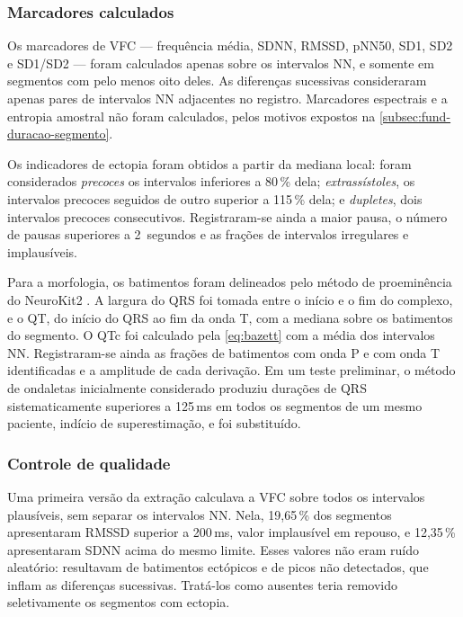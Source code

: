 \subsubsection{Marcadores calculados}

Os marcadores de \gls{VFC} --- frequência média, SDNN, RMSSD, pNN50, SD1,
SD2 e SD1/SD2 --- foram calculados apenas sobre os intervalos NN, e somente
em segmentos com pelo menos oito deles. As diferenças sucessivas
consideraram apenas pares de intervalos NN adjacentes no registro.
Marcadores espectrais e a entropia amostral não foram calculados, pelos
motivos expostos na \autoref{subsec:fund-duracao-segmento}.

Os indicadores de ectopia foram obtidos a partir da mediana local: foram
considerados \textit{precoces} os intervalos inferiores a 80\,\% dela;
\textit{extrassístoles}, os intervalos precoces seguidos de outro superior a
115\,\% dela; e \textit{dupletes}, dois intervalos precoces consecutivos.
Registraram-se ainda a maior pausa, o número de pausas superiores a
2~segundos e as frações de intervalos irregulares e implausíveis.

Para a morfologia, os batimentos foram delineados pelo método de
proeminência do NeuroKit2 \cite{emrich2024}. A largura do QRS foi tomada
entre o início e o fim do complexo, e o QT, do início do QRS ao fim da onda
T, com a mediana sobre os batimentos do segmento. O QTc foi calculado pela
\autoref{eq:bazett} com a média dos intervalos NN. Registraram-se ainda as
frações de batimentos com onda P e com onda T identificadas e a amplitude
de cada derivação. Em um teste preliminar, o método de ondaletas
inicialmente considerado produziu durações de QRS sistematicamente
superiores a 125\,ms em todos os segmentos de um mesmo paciente, indício de
superestimação, e foi substituído.

\subsubsection{Controle de qualidade}

Uma primeira versão da extração calculava a \gls{VFC} sobre todos os
intervalos plausíveis, sem separar os intervalos NN. Nela, 19,65\,\% dos
segmentos apresentaram RMSSD superior a 200\,ms, valor implausível em
repouso, e 12,35\,\% apresentaram SDNN acima do mesmo limite. Esses valores
não eram ruído aleatório: resultavam de batimentos ectópicos e de picos não
detectados, que inflam as diferenças sucessivas. Tratá-los como ausentes
teria removido seletivamente os segmentos com ectopia.

